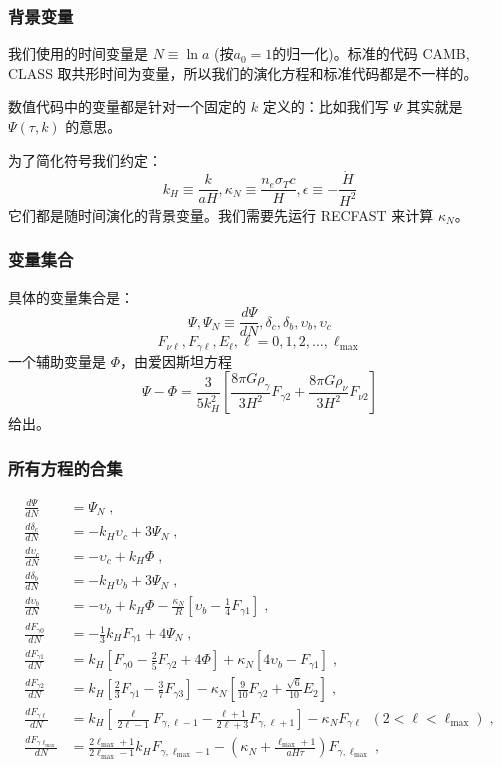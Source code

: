 \documentclass[CJK,13pt]{beamer}
\begin{document}


  \begin{frame}
    \frametitle{背景变量}
    我们使用的时间变量是 $N\equiv \ln a$ (按$a_0=1$的归一化)。标准的代码 CAMB, CLASS 取共形时间为变量，所以我们的演化方程和标准代码都是不一样的。

    \skipline
    
    数值代码中的变量都是针对一个固定的 $k$ 定义的：比如我们写 $\Psi$ 其实就是 $\Psi(\tau, k)$ 的意思。

    \skipline
    
    为了简化符号我们约定：
    $$k_H\equiv \frac{k}{aH}, \kappa_N \equiv \frac{n_e\sigma_Tc}{H}, \epsilon\equiv -\frac{\dot H}{H^2}$$
    它们都是随时间演化的背景变量。我们需要先运行 RECFAST 来计算 $\kappa_N$。
  \end{frame}

  \begin{frame}    
    \frametitle{变量集合}    
    具体的变量集合是：
    $$\Psi, \Psi_N \equiv \frac{d\Psi}{dN}, \delta_c, \delta_b, \upsilon_{b}, \upsilon_{c}$$ 
    $$F_{\nu\ell},F_{\gamma\ell}, E_{\ell},  \ell = 0,1,2,\ldots, \ell_{\max}$$
    一个辅助变量是 $\Phi$，由爱因斯坦方程
    $$ \Psi - \Phi = \frac{3}{5k_H^2}\left[\frac{8\pi G\rho_\gamma}{3H^2}F_{\gamma 2} + \frac{8\pi G\rho_\nu}{3H^2}F_{\nu 2} \right]$$
    给出。
  \end{frame}
  
  \begin{frame}
    \frametitle{所有方程的合集}
{\tiny
\begin{align}
\frac{d\Psi}{dN} &= \Psi_N\; ,\\
 \frac{d\delta_c}{dN} &= - k_H \upsilon_{c} + 3 \Psi_N \;,\\
 \frac{d \upsilon_{c}}{dN} &= - \upsilon_{c} + k_H \Phi \; , \\
\frac{d\delta_b}{dN} &= - k_H \upsilon_{b} + 3 \Psi_N \;, \\
\frac{d\upsilon_{b}}{dN} &= - \upsilon_{b} + k_H\Phi - \frac{\kappa_N}{R} \left[\upsilon_{b} - \frac{1}{4}F_{\gamma 1}\right]\;,\\
\frac{d F_{\gamma 0}}{dN} &=  - \frac{1}{3} k_H F_{\gamma 1} + 4 \Psi_N\;,  \label{eq:hiestart}\\
\frac{d F_{\gamma 1}}{dN} &= k_H\left[  F_{\gamma 0} - \frac{2}{5} F_{\gamma 2} + 4 \Phi\right] + \kappa_N \left[4\upsilon_{b} - F_{\gamma 1}\right]\;,\\
\frac{d F_{\gamma 2}}{dN} &= k_H\left[ \frac{2}{3} F_{\gamma 1} - \frac{3}{7} F_{\gamma 3} \right] - \kappa_N \left[\frac{9}{10}F_{\gamma 2}+\frac{\sqrt{6}}{10}E_2\right]\;,\\
\frac{d F_{\gamma \ell}}{dN} &= k_H \left[\frac{\ell}{2\ell - 1} F_{\gamma,\ell - 1} - \frac{\ell+1}{2\ell + 3} F_{\gamma,\ell+1}\right] - \kappa_N F_{\gamma \ell}\; \;(2<\ell<\ell_{\max})\;,\\
\frac{dF_{\gamma \ell_{\max}}}{dN} &= \frac{2\ell_{\max}+1}{2\ell_{\max}-1} k_HF_{\gamma, \ell_{\max}-1} - \left(\kappa_N + \frac{\ell_{\max}+1}{aH\tau}\right) F_{\gamma, \ell_{\max}}\;,
\end{align}}
  \end{frame}
\end{document}
